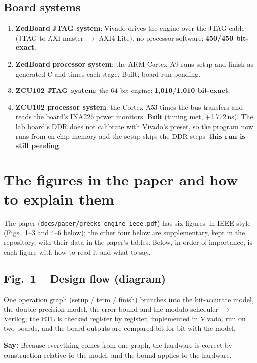 \documentclass[11pt,a4paper]{article}
\newcommand{\say}[1]{\par\smallskip\noindent\colorbox{qbg}{\parbox{\dimexpr\linewidth-2\fboxsep}{\textbf{Say:} #1}}\par\smallskip}
\begin{document}
\subsection{Board systems}
\begin{enumerate}
\item \textbf{ZedBoard JTAG system}: Vivado drives the engine over the JTAG cable (JTAG-to-AXI
master $\rightarrow$ AXI4-Lite), no processor software: \textbf{450/450 bit-exact}.
\item \textbf{ZedBoard processor system}: the ARM Cortex-A9 runs setup and finish as
generated C and times each stage. Built; board run pending.
\item \textbf{ZCU102 JTAG system}: the 64-bit engine: \textbf{1,010/1,010 bit-exact}.
\item \textbf{ZCU102 processor system}: the Cortex-A53 times the bus transfers and reads the
board's INA226 power monitors. Built (timing met, +1.772\,ns). The lab board's DDR does not
calibrate with Vivado's preset, so the program now runs from on-chip memory and the setup
skips the DDR steps; \textbf{this run is still pending}.
\end{enumerate}

\section{The figures in the paper and how to explain them}
The paper (\texttt{docs/paper/greeks\_engine\_ieee.pdf}) has six figures, in IEEE style (Figs.~1--3 and 4--6 below); the other four below are supplementary, kept in the repository, with their data in the paper's tables.
Below, in order of importance, is each figure with how to read it and what to say.

\subsection*{Fig.~1 -- Design flow (diagram)}
One operation graph (setup / term / finish) branches into the bit-accurate model, the
double-precision model, the error bound and the modulo scheduler $\rightarrow$ Verilog; the RTL
is checked register by register, implemented in Vivado, run on two boards, and the board
outputs are compared bit for bit with the model.
\say{Because everything comes from one graph, the hardware is correct by construction relative
to the model, and the bound applies to the hardware.}
\end{document}
